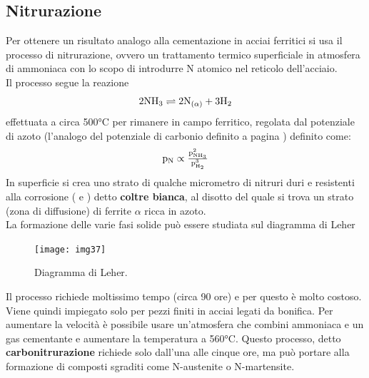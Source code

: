 \subsection{Nitrurazione}
Per ottenere un risultato analogo alla cementazione in acciai ferritici si usa il processo di nitrurazione, ovvero un trattamento termico superficiale in atmosfera di ammoniaca con lo scopo di introdurre N atomico nel reticolo dell'acciaio.\\
Il processo segue la reazione
\begin{equation*}
    \mbox{$\mathrm{2NH_3 \rightleftharpoons 2N_{(\alpha)} + 3H_2}$}
\end{equation*}
effettuata a circa 500°C per rimanere in campo ferritico, regolata dal potenziale di azoto (l'analogo del potenziale di carbonio definito a pagina \pageref{eq:PotC}) definito come:
\begin{equation*}
    \mbox{$\mathrm{p_N \propto \frac{p^2_{NH_3}}{p^3_{H_2}}}$}
\end{equation*}
In superficie si crea uno strato di qualche micrometro di nitruri duri e resistenti alla corrosione ( e ) detto \textbf{coltre bianca}, al disotto del quale si trova un strato (zona di diffusione) di ferrite $\alpha$ ricca in azoto.\\
La formazione delle varie fasi solide può essere studiata sul diagramma di Leher

\begin{figure}[!hbt]
    \texttt{[image: img37]}
    \caption{Diagramma di Leher.}
\end{figure}

Il processo richiede moltissimo tempo (circa 90 ore) e per questo è molto costoso. Viene quindi impiegato solo per pezzi finiti in acciai legati da bonifica.
Per aumentare la velocità è possibile usare un'atmosfera che combini ammoniaca e un gas cementante e aumentare la temperatura a 560°C. Questo processo, detto \textbf{carbonitrurazione} richiede solo dall'una alle cinque ore, ma può portare alla formazione di composti sgraditi come N-austenite o N-martensite.

